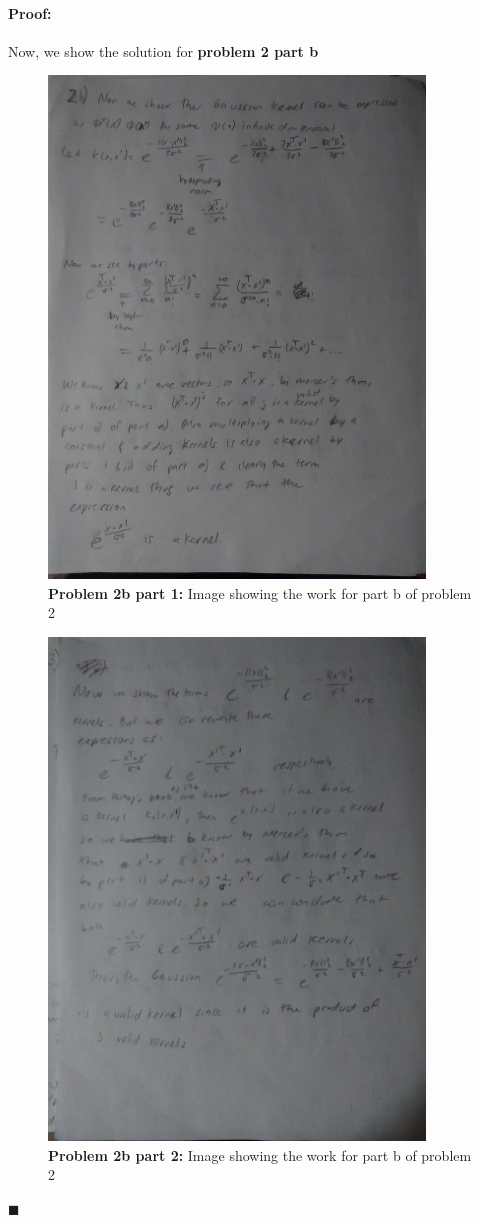 \documentclass[12pt]{article}
\newenvironment{proof}{\paragraph{Proof: }}{\hfill$\blacksquare$}
\begin{document}
\begin{proof}
 Now, we show the solution for \textbf{problem 2 part b}
\begin{figure}[!htbp]
\centering
\includegraphics[width=10cm]{hw3_prob2b_1.jpg}
\caption{\textbf{Problem 2b part 1:} Image showing the work for part b of problem 2}
\end{figure}

\begin{figure}[!htbp]
\centering
\includegraphics[width=10cm]{hw3_prob2b_2.jpg}
\caption{\textbf{Problem 2b part 2:} Image showing the work for part b of problem 2}
\end{figure}

\end{proof}
\end{document}
